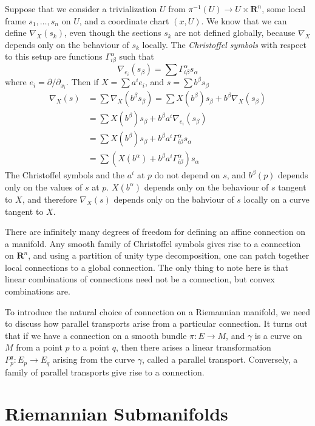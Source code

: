 Suppose that we consider a trivialization $U$ from $\pi^{-1}(U) \to U \times \mathbf{R}^n$, some local frame $s_1, \dots, s_n$ on $U$, and a coordinate chart $(x,U)$. We know that we can define $\nabla_X(s_k)$, even though the sections $s_k$ are not defined globally, because $\nabla_X$ depends only on the behaviour of $s_k$ locally.  The \emph{Christoffel symbols} with respect to this setup are functions $\Gamma_{i \beta}^\alpha$ such that
%
\[ \nabla_{e_i}(s_\beta) = \sum \Gamma_{i \beta}^\alpha s_\alpha \]
%
where $e_i = \partial/\partial_{x_i}$. Then if $X = \sum a^i e_i$, and $s = \sum b^\beta s_\beta$
%
\begin{align*}
    \nabla_X(s) &= \sum \nabla_X(b^\beta s_\beta) = \sum X(b^\beta) s_\beta + b^\beta \nabla_X(s_\beta)\\
    &= \sum X(b^\beta) s_\beta + b^\beta a^i \nabla_{e_i}(s_\beta)\\
    &= \sum X(b^\beta) s_\beta + b^\beta a^i \Gamma_{i \beta}^\alpha s_\alpha\\
    &= \sum \left( X(b^\alpha) + b^\beta a^i \Gamma_{i \beta}^\alpha \right) s_\alpha
\end{align*}
%
The Christoffel symbols and the $a^i$ at $p$ do not depend on $s$, and $b^\beta(p)$ depends only on the values of $s$ at $p$. $X(b^\alpha)$ depends only on the behaviour of $s$ tangent to $X$, and therefore $\nabla_X(s)$ depends only on the bahviour of $s$ locally on a curve tangent to $X$.

There are infinitely many degrees of freedom for defining an affine connection on a manifold. Any smooth family of Christoffel symbols gives rise to a connection on $\mathbf{R}^n$, and using a partition of unity type decomposition, one can patch together local connections to a global connection. The only thing to note here is that linear combinations of connections need not be a connection, but convex combinations are.

To introduce the natural choice of connection on a Riemannian manifold, we need to discuss how parallel transports arise from a particular connection. It turns out that if we have a connection on a smooth bundle $\pi: E \to M$, and $\gamma$ is a curve on $M$ from a point $p$ to a point $q$, then there arises a linear transformation $P_p^q: E_p \to E_q$ arising from the curve $\gamma$, called a parallel transport. Conversely, a family of parallel transports give rise to a connection.

\section{Riemannian Submanifolds}

